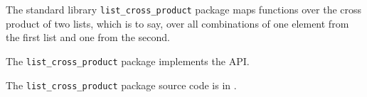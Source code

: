 
The standard library {\tt list\_cross\_product} package maps functions over the 
cross product of two lists, which is to say, over all combinations of one element 
from the first list and one from the second.

The {\tt list\_cross\_product} package implements the  API.

The {\tt list\_cross\_product} package source code is in .




